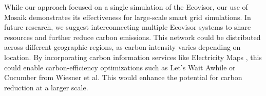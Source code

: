While our approach focused on a single simulation of the Ecovisor, our use of
Mosaik demonstrates its effectiveness for large-scale smart grid simulations. In
future research, we suggest interconnecting multiple Ecovisor systems to share
resources and further reduce carbon emissions. This network could be distributed
across different geographic regions, as carbon intensity varies depending on
location. By incorporating carbon information services like Electricity Maps
\cite{electricity_maps}, this could enable carbon-efficiency optimizations such
as Let’s Wait Awhile \cite{wiesner2021} or Cucumber \cite{wiesner2022} from
Wiesner et al. This would enhance the potential for carbon reduction at a larger
scale.
